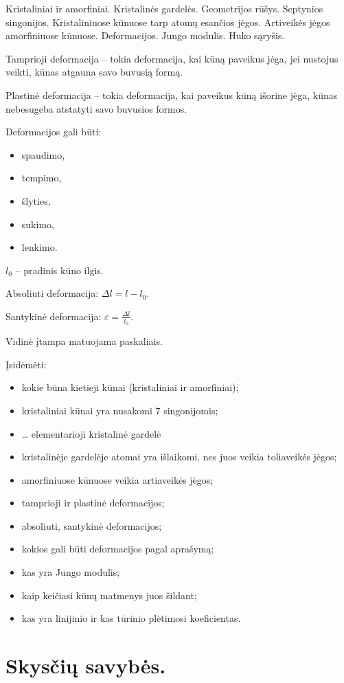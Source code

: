 Kristaliniai ir amorfiniai. Kristalinės gardelės. Geometrijos rūšys.
Septynios singonijos. Kristaliniuose kūnuose tarp atomų esančios jėgos.
Artiveikės jėgos amorfiniuose kūnuose. Deformacijos. Jungo modulis.
Huko sąryšis.

Tamprioji deformacija – tokia deformacija, kai kūną paveikus jėga, jei
nustojus veikti, kūnas atgauna savo buvusią formą.

Plastinė deformacija – tokia deformacija, kai paveikus kūną išorine jėga,
kūnas nebesugeba atstatyti savo buvusios formos.

Deformacijos gali būti:
\begin{itemize}
  \item spaudimo,
  \item tempimo,
  \item šlyties,
  \item sukimo,
  \item lenkimo.
\end{itemize}

$l_{0}$ – pradinis kūno ilgis.

Absoliuti deformacija: $\Delta l = l - l_{0}$.

Santykinė deformacija: $\varepsilon = \frac{\Delta l}{l_{0}}$.

Vidinė įtampa matuojama paskaliais.

Įsidėmėti:
\begin{itemize}
  \item kokie būna kietieji kūnai (kristaliniai ir amorfiniai);
  \item kristaliniai kūnai yra nusakomi 7 singonijomis;
  \item … elementarioji kristalinė gardelė
  \item kristalinėje gardelėje atomai yra išlaikomi, nes juos veikia
    toliaveikės jėgos;
  \item amorfiniuose kūnuose veikia artiaveikės jėgos;
  \item tamprioji ir plastinė deformacijos;
  \item absoliuti, santykinė deformacijos;
  \item kokios gali būti deformacijos pagal aprašymą;
  \item kas yra Jungo modulis;
  \item kaip keičiasi kūnų matmenys juos šildant;
  \item kas yra linijinio ir kas tūrinio plėtimosi koeficientas.
\end{itemize}

\section{Skysčių savybės.}

